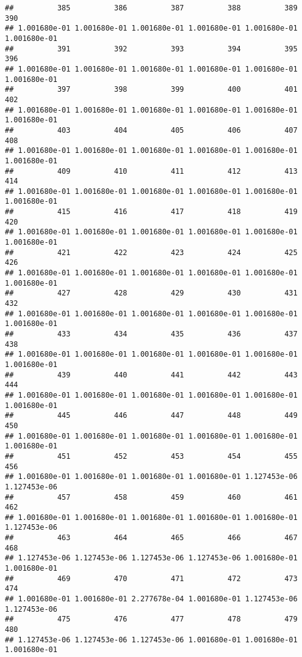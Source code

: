 \documentclass[
]{article}
\begin{document}
\begin{verbatim}
##          385          386          387          388          389          390 
## 1.001680e-01 1.001680e-01 1.001680e-01 1.001680e-01 1.001680e-01 1.001680e-01 
##          391          392          393          394          395          396 
## 1.001680e-01 1.001680e-01 1.001680e-01 1.001680e-01 1.001680e-01 1.001680e-01 
##          397          398          399          400          401          402 
## 1.001680e-01 1.001680e-01 1.001680e-01 1.001680e-01 1.001680e-01 1.001680e-01 
##          403          404          405          406          407          408 
## 1.001680e-01 1.001680e-01 1.001680e-01 1.001680e-01 1.001680e-01 1.001680e-01 
##          409          410          411          412          413          414 
## 1.001680e-01 1.001680e-01 1.001680e-01 1.001680e-01 1.001680e-01 1.001680e-01 
##          415          416          417          418          419          420 
## 1.001680e-01 1.001680e-01 1.001680e-01 1.001680e-01 1.001680e-01 1.001680e-01 
##          421          422          423          424          425          426 
## 1.001680e-01 1.001680e-01 1.001680e-01 1.001680e-01 1.001680e-01 1.001680e-01 
##          427          428          429          430          431          432 
## 1.001680e-01 1.001680e-01 1.001680e-01 1.001680e-01 1.001680e-01 1.001680e-01 
##          433          434          435          436          437          438 
## 1.001680e-01 1.001680e-01 1.001680e-01 1.001680e-01 1.001680e-01 1.001680e-01 
##          439          440          441          442          443          444 
## 1.001680e-01 1.001680e-01 1.001680e-01 1.001680e-01 1.001680e-01 1.001680e-01 
##          445          446          447          448          449          450 
## 1.001680e-01 1.001680e-01 1.001680e-01 1.001680e-01 1.001680e-01 1.001680e-01 
##          451          452          453          454          455          456 
## 1.001680e-01 1.001680e-01 1.001680e-01 1.001680e-01 1.127453e-06 1.127453e-06 
##          457          458          459          460          461          462 
## 1.001680e-01 1.001680e-01 1.001680e-01 1.001680e-01 1.001680e-01 1.127453e-06 
##          463          464          465          466          467          468 
## 1.127453e-06 1.127453e-06 1.127453e-06 1.127453e-06 1.001680e-01 1.001680e-01 
##          469          470          471          472          473          474 
## 1.001680e-01 1.001680e-01 2.277678e-04 1.001680e-01 1.127453e-06 1.127453e-06 
##          475          476          477          478          479          480 
## 1.127453e-06 1.127453e-06 1.127453e-06 1.001680e-01 1.001680e-01 1.001680e-01 

\end{verbatim}
\end{document}
